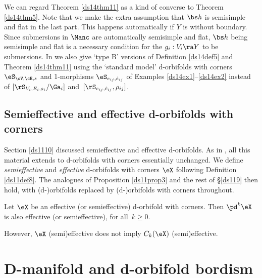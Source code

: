 \documentclass{article}
\begin{document}
We can regard Theorem \ref{ds14thm11} as a kind of converse to
Theorem \ref{ds14thm5}. Note that we make the extra assumption that
$\bs h$ is semisimple and flat in the last part. This happens
automatically if $Y$ is without boundary. Since
submersions in $\Manc$ are
automatically semisimple and flat, $\bs h$ being semisimple and flat
is a necessary condition for the $g_i:V_i\ra Y$ to be submersions.
In \cite[\S 12.9]{Joyc6} we also give `type B' versions of
Definition \ref{ds14def5} and Theorem \ref{ds14thm11} using the
`standard model' d-orbifolds with corners
$\eS_{\oV,\cE,s}$ and 1-morphisms
$\eS_{\smash{e_{ij},\hat e_{ij}}}$ of Examples
\ref{ds14ex1}--\ref{ds14ex2} instead of $[\rS_{V_i,E_i,s_i}/\Ga_i]$
and~$[\rS_{\smash{e_{ij},\hat e_{ij}}},\rho_{ij}]$.

\subsection{Semieffective and effective d-orbifolds with corners}
\label{ds1410}

Section \ref{ds1110} discussed semieffective and effective
d-orbifolds. As in \cite[\S 12.10]{Joyc6}, all this material extends
to d-orbifolds with corners essentially unchanged. We define {\it
semieffective\/} and {\it effective\/} d-orbifolds with corners
$\eX$ following Definition \ref{ds11def8}. The analogues of
Proposition \ref{ds11prop3} and the rest of \S\ref{ds119} then hold,
with (d-)orbifolds replaced by (d-)orbifolds with corners
throughout.

\begin{prop} Let\/ $\eX$ be an effective (or semieffective) d-orbifold
with corners. Then $\pd^k\eX$ is also effective (or semieffective),
for all\/~$k\ge 0$.
\label{ds14prop3}
\end{prop}

However, $\eX$ (semi)effective does not imply $C_k(\eX)$
(semi)effective.

\section{D-manifold and d-orbifold bordism}
\label{ds15}
\end{document}

